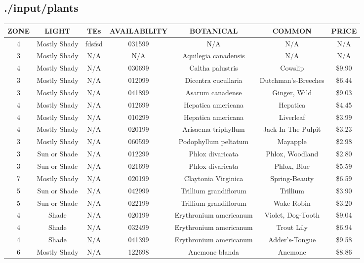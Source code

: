 \documentclass{article}
\begin{document}
\begin{center}
\section*{./input/plants}
\begin{tabular}{|c|c|c|c|c|c|c|}
\hline
ZONE & LIGHT & TEs & AVAILABILITY & BOTANICAL & COMMON & PRICE\\ \hline
4 & Mostly Shady & fdsfsd & 031599 & N/A & N/A & N/A\\ \hline
3 & Mostly Shady & N/A & N/A & Aquilegia canadensis & N/A & N/A\\ \hline
4 & Mostly Shady & N/A & 030699 & Caltha palustris & Cowslip & \$9.90\\ \hline
3 & Mostly Shady & N/A & 012099 & Dicentra cucullaria & Dutchman's-Breeches & \$6.44\\ \hline
3 & Mostly Shady & N/A & 041899 & Asarum canadense & Ginger, Wild & \$9.03\\ \hline
4 & Mostly Shady & N/A & 012699 & Hepatica americana & Hepatica & \$4.45\\ \hline
4 & Mostly Shady & N/A & 010299 & Hepatica americana & Liverleaf & \$3.99\\ \hline
4 & Mostly Shady & N/A & 020199 & Arisaema triphyllum & Jack-In-The-Pulpit & \$3.23\\ \hline
3 & Mostly Shady & N/A & 060599 & Podophyllum peltatum & Mayapple & \$2.98\\ \hline
3 & Sun or Shade & N/A & 012299 & Phlox divaricata & Phlox, Woodland & \$2.80\\ \hline
3 & Sun or Shade & N/A & 021699 & Phlox divaricata & Phlox, Blue & \$5.59\\ \hline
7 & Mostly Shady & N/A & 020199 & Claytonia Virginica & Spring-Beauty & \$6.59\\ \hline
5 & Sun or Shade & N/A & 042999 & Trillium grandiflorum & Trillium & \$3.90\\ \hline
5 & Sun or Shade & N/A & 022199 & Trillium grandiflorum & Wake Robin & \$3.20\\ \hline
4 & Shade & N/A & 020199 & Erythronium americanum & Violet, Dog-Tooth & \$9.04\\ \hline
4 & Shade & N/A & 032499 & Erythronium americanum & Trout Lily & \$6.94\\ \hline
4 & Shade & N/A & 041399 & Erythronium americanum & Adder's-Tongue & \$9.58\\ \hline
6 & Mostly Shady & N/A & 122698 & Anemone blanda & Anemone & \$8.86\\ \hline

\end{tabular}
\end{center}
\end{document}

